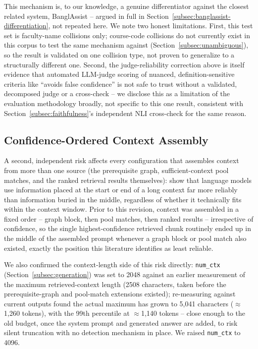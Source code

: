 \documentclass[a4paper,twoside]{article}
\begin{document}
This mechanism is, to our knowledge, a genuine differentiator against the closest related system, BanglAssist -- argued in full in Section~\ref{subsec:banglassist-differentiation}, not repeated here. We note two honest limitations. First, this test set is faculty-name collisions only; course-code collisions do not currently exist in this corpus to test the same mechanism against (Section~\ref{subsec:unambiguous}), so the result is validated on one collision type, not proven to generalize to a structurally different one. Second, the judge-reliability correction above is itself evidence that automated LLM-judge scoring of nuanced, definition-sensitive criteria like ``avoids false confidence'' is not safe to trust without a validated, decomposed judge or a cross-check -- we disclose this as a limitation of the evaluation methodology broadly, not specific to this one result, consistent with Section~\ref{subsec:faithfulness}'s independent NLI cross-check for the same reason.

\subsection{Confidence-Ordered Context Assembly}
\label{subsec:confidence-ordering}

A second, independent risk affects every configuration that assembles context from more than one source (the prerequisite graph, sufficient-context pool matches, and the ranked retrieval results themselves): \citet{liu2024lost} show that language models use information placed at the start or end of a long context far more reliably than information buried in the middle, regardless of whether it technically fits within the context window. Prior to this revision, context was assembled in a fixed order -- graph block, then pool matches, then ranked results -- irrespective of confidence, so the single highest-confidence retrieved chunk routinely ended up in the middle of the assembled prompt whenever a graph block or pool match also existed, exactly the position this literature identifies as least reliable.

We also confirmed the context-length side of this risk directly: \texttt{num\_ctx} (Section~\ref{subsec:generation}) was set to 2048 against an earlier measurement of the maximum retrieved-context length (2508 characters, taken before the prerequisite-graph and pool-match extensions existed); re-measuring against current outputs found the actual maximum has grown to 5,041 characters ($\approx$1,260 tokens), with the 99th percentile at $\approx$1,140 tokens -- close enough to the old budget, once the system prompt and generated answer are added, to risk silent truncation with no detection mechanism in place. We raised \texttt{num\_ctx} to 4096.
\end{document}
